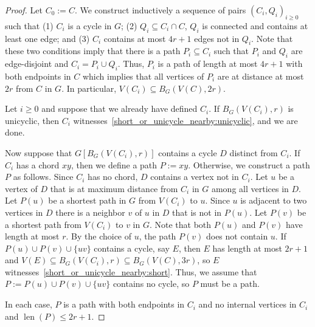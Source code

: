 \documentclass{patmorin}
\DeclareMathOperator{\len}{len}
\begin{document}
\begin{proof}
  Let $C_0:=C$.
  We construct inductively a sequence of pairs $(C_i,Q_i)_{i\geq0}$ such that
  (1) $C_i$ is a cycle in $G$;
  (2) $Q_i\subseteq C_i\cap C$, $Q_i$ is connected and contains at least one edge; and
  (3) $C_i$ contains at most $4r+1$ edges not in $Q_i$.
  Note that these two conditions imply that there is a path $P_i\subseteq C_i$  such that
  $P_i$ and $Q_i$ are edge-disjoint and $C_i=P_i\cup Q_i$.
  Thus, $P_i$ is a path of length at most $4r+1$ with both endpoints in $C$
  which implies that all vertices of $P_i$ are at distance at most $2r$ from $C$ in $G$.
  In particular, $V(C_i)\subseteq B_G(V(C),2r)$.

  Let $i\geq0$ and suppose that we already have defined $C_i$.
  If $B_G(V(C_i),r)$ is unicyclic, then $C_i$ witnesses~\eqref{short_or_unicycle_nearby:unicyclic}, and we are done.

  Now suppose that $G[B_G(V(C_i),r)]$ contains a cycle $D$ distinct from $C_i$.  If $C_i$ has a chord $xy$, then we define a path $P:=xy$.  Otherwise, we construct a path $P$ as follows. Since $C_i$ has no chord, $D$ contains a vertex not in $C_i$.  Let $u$ be a vertex of $D$ that is at maximum distance from $C_i$ in $G$ among all vertices in $D$.
  Let $P(u)$ be a shortest path in $G$ from $V(C_i)$ to $u$.
  Since $u$ is adjacent to two vertices in $D$ there is a neighbor $v$ of $u$ in $D$ that is not in $P(u)$.
  Let $P(v)$ be a shortest path from $V(C_i)$ to $v$ in $G$.
  Note that both $P(u)$ and $P(v)$ have length at most $r$.
  By the choice of $u$, the path $P(v)$ does not contain $u$.
  If $P(u)\cup P(v)\cup\{uv\}$ contains a cycle, say $E$, then $E$ has length at most $2r+1$ and $V(E)\subseteq B_G(V(C_i),r)\subseteq B_G(V(C),3r)$, so $E$ witnesses~\eqref{short_or_unicycle_nearby:short}.
  Thus, we assume that $P:=P(u)\cup P(v)\cup\{uv\}$ contains no cycle, so $P$ must be a path.

  In each case, $P$ is a path with both endpoints in $C_i$ and no internal vertices in $C_i$ and $\len(P)\le 2r+1$.


\end{proof}
\end{document}
